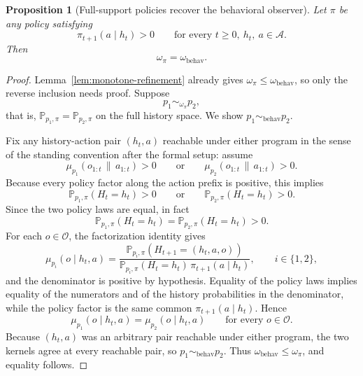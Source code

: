 \documentclass[11pt]{article}
\newtheorem{proposition}[theorem]{Proposition}
\theoremstyle{definition}
\theoremstyle{remark}
\newcommand{\Acal}{\mathcal{A}}
\newcommand{\Ocal}{\mathcal{O}}
\newcommand{\Prob}{\mathbb{P}}
\newcommand{\givena}{\,\|\,}
\begin{document}
\begin{proposition}[Full-support policies recover the behavioral observer]
\label{prop:full-support-behavioral}
Let $\pi$ be any policy satisfying
\[
\pi_{t+1}(a\mid h_t)>0
\qquad
\text{for every }t\ge 0,\ h_t,\ a\in\Acal.
\]
Then
\[
\omega_\pi=\omega_{\mathrm{behav}}.
\]
\end{proposition}

\begin{proof}
Lemma~\ref{lem:monotone-refinement} already gives $\omega_\pi\le\omega_{\mathrm{behav}}$, so only the reverse inclusion needs proof. Suppose
\[
p_1\sim_{\omega_\pi}p_2,
\]
that is, $\Prob_{p_1,\pi}=\Prob_{p_2,\pi}$ on the full history space. We show $p_1\sim_{\mathrm{behav}}p_2$.

Fix any history-action pair $(h_t,a)$ reachable under either program in the sense of the standing convention after the formal setup: assume
\[
\mu_{p_1}(o_{1:t}\givena a_{1:t})>0
\qquad\text{or}\qquad
\mu_{p_2}(o_{1:t}\givena a_{1:t})>0.
\]
Because every policy factor along the action prefix is positive, this implies
\[
\Prob_{p_1,\pi}(H_t=h_t)>0
\qquad\text{or}\qquad
\Prob_{p_2,\pi}(H_t=h_t)>0.
\]
Since the two policy laws are equal, in fact
\[
\Prob_{p_1,\pi}(H_t=h_t)=\Prob_{p_2,\pi}(H_t=h_t)>0.
\]
For each $o\in\Ocal$, the factorization identity gives
\[
\mu_{p_i}(o\mid h_t,a)
=
\frac{\Prob_{p_i,\pi}(H_{t+1}=(h_t,a,o))}
{\Prob_{p_i,\pi}(H_t=h_t)\,\pi_{t+1}(a\mid h_t)},
\qquad i\in\{1,2\},
\]
and the denominator is positive by hypothesis. Equality of the policy laws implies equality of the numerators and of the history probabilities in the denominator, while the policy factor is the same common $\pi_{t+1}(a\mid h_t)$. Hence
\[
\mu_{p_1}(o\mid h_t,a)=\mu_{p_2}(o\mid h_t,a)
\qquad\text{for every }o\in\Ocal.
\]
Because $(h_t,a)$ was an arbitrary pair reachable under either program, the two kernels agree at every reachable pair, so $p_1\sim_{\mathrm{behav}}p_2$. Thus $\omega_{\mathrm{behav}}\le\omega_\pi$, and equality follows.
\end{proof}
\end{document}
